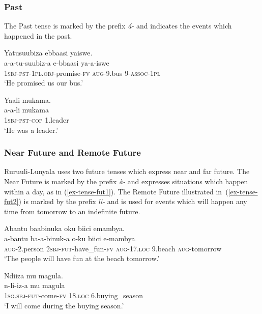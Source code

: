 \subsubsection{Past}

The Past tense is marked by the prefix \textit{á-} and indicates the events which happened  in the past.

\ea \label{ex-tense-past}
\begin{xlist}
	
\ex	\label{ex-tense-past1}
	\glll Yatusuubiza ebbaasi yaiswe.\\
	 a-a-tu-suubiz-a         e-bbaasi     ya-a-iswe\\
		\textsc{1sbj}-\textsc{pst}-\textsc{1pl.obj}-promise-\textsc{fv} \textsc{aug}-9.bus     9-\textsc{assoc}-\textsc{1pl}\\
	\glt ‘He promised us our bus.’
	
\ex	\label{ex-tense-past2}
	\glll Yaali mukama.\\
	 a-a-li mukama\\
		\textsc{1sbj}-\textsc{pst}-\textsc{cop} 1.leader\\
	\glt     ‘He was a leader.’
\end{xlist}
\z

\subsubsection{Near Future and Remote Future}

Ruruuli-Lunyala uses two future tenses which express near and far future. 
The Near Future is marked by the prefix \textit{à-} and expresses situations which happen within a day, as in (\ref{ex-tense-fut1}). 
The Remote Future illustrated in~(\ref{ex-tense-fut2}) is marked by the prefix \textit{li-} and is used for events which will happen any time from tomorrow to an indefinite future. 

\ea \label{ex-tense-fut}
\begin{xlist}
\ex	\label{ex-tense-fut1}
	\glll Abantu baabinuka oku biici emambya.\\
	a-bantu ba-a-binuk-a o-ku biici e-mambya\\
		\textsc{aug}-2.person \textsc{2sbj}-\textsc{fut}-have\_fun-\textsc{fv} \textsc{aug}-17.\textsc{loc} 9.beach \textsc{aug}-tomorrow\\
	\glt ‘The people will have fun at the beach tomorrow.'
	
		
\ex	\label{ex-tense-fut2}
	\glll Ndiiza mu magula.\\
	n-li-iz-a mu magula\\
		\textsc{1sg.sbj}-\textsc{fut}-come-\textsc{fv} 18.\textsc{loc} 6.buying\_season\\
	\glt   `I will come during the buying season.'
\end{xlist}
\z


